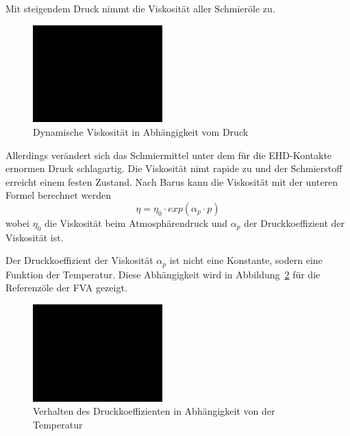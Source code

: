 Mit steigendem Druck nimmt die Viskosität aller Schmieröle zu.
\begin{figure}[htb]
    \centering
    \includegraphics[width=5cm]{./images/blank_img.jpg}
    \caption{Dynamische Viskosität in Abhängigkeit vom Druck}
    \label{fig:dynamische_viskositaet_in_abhaengigkeit_vom_druck}
\end{figure}
%
Allerdings verändert sich das Schmiermittel unter dem für die EHD-Kontakte ernormen Druck schlagartig.
Die Viskosität nimt rapide zu und der Schmierstoff erreicht einem festen Zustand.
Nach Barus kann die Viskosität mit der unteren Formel berechnet werden
\begin{equation}
    \eta = \eta_0 \cdot exp(\alpha_p \cdot p)
    \label{eq:dynamische_viskositaet_druck_barus}
\end{equation}
%
wobei $\eta_0$ die Viskosität beim Atmosphärendruck und $\alpha_p$ der Druckkoeffizient der Viskosität ist.

Der Druckkoeffizient der Viskosität $\alpha_p$ ist nicht eine Konstante, sodern eine Funktion der Temperatur.
Diese Abhängigkeit wird in Abbildung~\ref{fig:druckkoeffizient_temperatur} für die Referenzöle der FVA gezeigt.
\begin{figure}[htb]
    \centering
    \includegraphics[width=5cm]{./images/blank_img.jpg}
    \caption{Verhalten des Druckkoeffizienten in Abhängigkeit von der Temperatur}
    \label{fig:druckkoeffizient_temperatur}
\end{figure}
%

